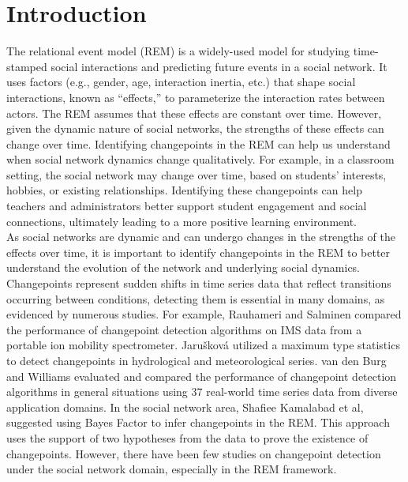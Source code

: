 \documentclass[]{interact}
\theoremstyle{plain}%
\theoremstyle{definition}
\theoremstyle{remark}
\begin{document}
	\section{\fontsize{14}{15}\selectfont Introduction} \label{sec:intro}
	
	\hspace{0.2cm} The relational event model (REM) is a widely-used model for studying time-stamped social interactions and predicting future events in a social network. It uses factors (e.g., gender, age, interaction inertia, etc.) that shape social interactions, known as ``effects,''\cite{buttsRelationalEventFramework2008} to parameterize the interaction rates between actors. The REM assumes that these effects are constant over time. However, given the dynamic nature of social networks, the strengths of these effects can change over time. Identifying changepoints in the REM can help us understand when social network dynamics change qualitatively. For example, in a classroom setting, the social network may change over time, based on students' interests, hobbies, or existing relationships. Identifying these changepoints can help teachers and administrators better support student engagement and social connections, ultimately leading to a more positive learning environment. \\
	
	As social networks are dynamic and can undergo changes in the strengths of the effects over time, it is important to identify changepoints in the REM to better understand the evolution of the network and underlying social dynamics. Changepoints represent sudden shifts in time series data that reflect transitions occurring between conditions\cite{sharmaTrendAnalysisChange2016}\cite{aminikhanghahiSurveyMethodsTime2017}, detecting them is essential in many domains, as evidenced by numerous studies. For example, Rauhameri and Salminen compared the performance of changepoint detection algorithms on IMS data from a portable ion mobility spectrometer\cite{rauhameriComparisonOnlineMethods2022}. Jarušková utilized a maximum type statistics to detect changepoints in hydrological and meteorological series\cite{jaruskovaProblemsApplicationChangePoint1997}. van den Burg and Williams evaluated and compared the performance of changepoint detection algorithms in general situations using 37 real-world time series data from diverse application domains\cite{burgEvaluationChangePoint2022}. In the social network area, Shafiee Kamalabad et al, suggested using Bayes Factor to infer changepoints in the REM\cite{shafieekamalabadWhatPointChange2023}. This approach uses the support of two hypotheses from the data to prove the existence of changepoints. However, there have been few studies on changepoint detection under the social network domain, especially in the REM framework. \\
	
\end{document}

